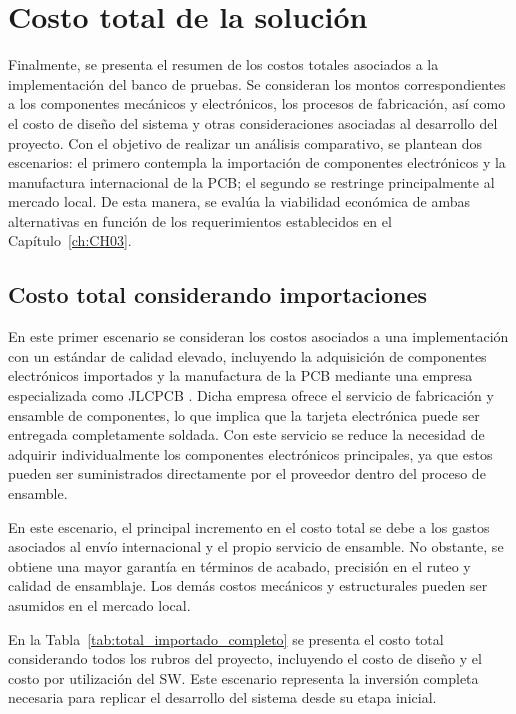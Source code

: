 \section{Costo total de la solución}

\noindent
Finalmente, se presenta el resumen de los costos totales asociados a la implementación del banco de pruebas. Se consideran los montos correspondientes a los componentes mecánicos y electrónicos, los procesos de fabricación, así como el costo de diseño del sistema y otras consideraciones asociadas al desarrollo del proyecto. Con el objetivo de realizar un análisis comparativo, se plantean dos escenarios: el primero contempla la importación de componentes electrónicos y la manufactura internacional de la \ac{PCB}; el segundo se restringe principalmente al mercado local. De esta manera, se evalúa la viabilidad económica de ambas alternativas en función de los requerimientos establecidos en el Capítulo~\ref{ch:CH03}.

\subsection{Costo total considerando importaciones}

\noindent
En este primer escenario se consideran los costos asociados a una implementación con un estándar de calidad elevado, incluyendo la adquisición de componentes electrónicos importados y la manufactura de la \ac{PCB} mediante una empresa especializada como JLCPCB \autocite{jlcpcb_quote_es}. Dicha empresa ofrece el servicio de fabricación y ensamble de componentes, lo que implica que la tarjeta electrónica puede ser entregada completamente soldada. Con este servicio se reduce la necesidad de adquirir individualmente los componentes electrónicos principales, ya que estos pueden ser suministrados directamente por el proveedor dentro del proceso de ensamble.

\noindent
En este escenario, el principal incremento en el costo total se debe a los gastos asociados al envío internacional y el propio servicio de ensamble. No obstante, se obtiene una mayor garantía en términos de acabado, precisión en el ruteo y calidad de ensamblaje. Los demás costos mecánicos y estructurales pueden ser asumidos en el mercado local.

\noindent
En la Tabla~\ref{tab:total_importado_completo} se presenta el costo total considerando todos los rubros del proyecto, incluyendo el costo de diseño y el costo por utilización del \ac{SW}. Este escenario representa la inversión completa necesaria para replicar el desarrollo del sistema desde su etapa inicial.

